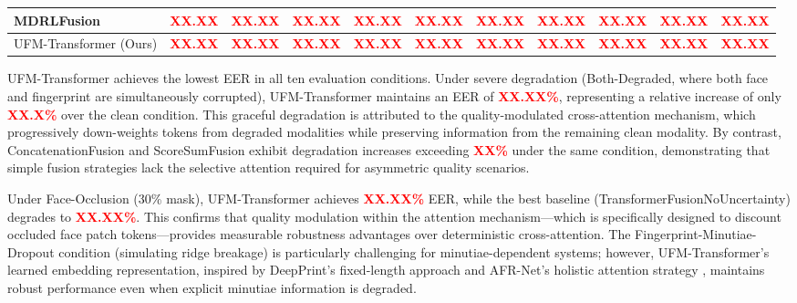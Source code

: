 \documentclass[10pt,journal,compsoc]{IEEEtran}
\begin{document}
\begin{table}[htbp]
\begin{tabular}{l | c | c c c c c c | c c c}
MDRLFusion & \textcolor{red}{\textbf{XX.XX}} & \textcolor{red}{\textbf{XX.XX}} & \textcolor{red}{\textbf{XX.XX}} & \textcolor{red}{\textbf{XX.XX}} & \textcolor{red}{\textbf{XX.XX}} & \textcolor{red}{\textbf{XX.XX}} & \textcolor{red}{\textbf{XX.XX}} & \textcolor{red}{\textbf{XX.XX}} & \textcolor{red}{\textbf{XX.XX}} & \textcolor{red}{\textbf{XX.XX}} \\ %
\hline
UFM-Transformer (Ours) & \textcolor{red}{\textbf{XX.XX}} & \textcolor{red}{\textbf{XX.XX}} & \textcolor{red}{\textbf{XX.XX}} & \textcolor{red}{\textbf{XX.XX}} & \textcolor{red}{\textbf{XX.XX}} & \textcolor{red}{\textbf{XX.XX}} & \textcolor{red}{\textbf{XX.XX}} & \textcolor{red}{\textbf{XX.XX}} & \textcolor{red}{\textbf{XX.XX}} & \textcolor{red}{\textbf{XX.XX}} \\ %
\hline
\end{tabular}
\end{table}

UFM-Transformer achieves the lowest EER in all ten evaluation conditions. Under severe degradation (Both-Degraded, where both face and fingerprint are simultaneously corrupted), UFM-Transformer maintains an EER of \textcolor{red}{\textbf{XX.XX\%}}, %
representing a relative increase of only \textcolor{red}{\textbf{XX.X\%}} over the clean condition. %
This graceful degradation is attributed to the quality-modulated cross-attention mechanism, which progressively down-weights tokens from degraded modalities while preserving information from the remaining clean modality. By contrast, ConcatenationFusion and ScoreSumFusion exhibit degradation increases exceeding \textcolor{red}{\textbf{XX\%}} under the same condition, %
demonstrating that simple fusion strategies lack the selective attention required for asymmetric quality scenarios.

Under Face-Occlusion (30\% mask), UFM-Transformer achieves \textcolor{red}{\textbf{XX.XX\%}} EER, %
while the best baseline (TransformerFusionNoUncertainty) degrades to \textcolor{red}{\textbf{XX.XX\%}}. %
This confirms that quality modulation within the attention mechanism---which is specifically designed to discount occluded face patch tokens---provides measurable robustness advantages over deterministic cross-attention. The Fingerprint-Minutiae-Dropout condition (simulating ridge breakage) is particularly challenging for minutiae-dependent systems; however, UFM-Transformer's learned embedding representation, inspired by DeepPrint's fixed-length approach \cite{engelsma2021deepprint} and AFR-Net's holistic attention strategy \cite{grosz2024afrnet}, maintains robust performance even when explicit minutiae information is degraded.
\end{document}

